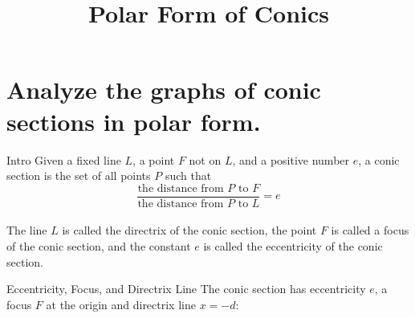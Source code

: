 \documentclass[t,usenames,dvipsnames]{beamer}
\title{Polar Form of Conics}
\author{}
\date{}
\begin{document}
\begin{frame}
    \titlepage
\end{frame}

\section{Analyze the graphs of conic sections in polar form.}

\begin{frame}{Intro}
Given a fixed line $L$, a point $F$ not on $L$, and a positive number $e$, a \alert{conic section} is the set of all points $P$ such that \vspace{10pt}
\[
\frac{\text{the distance from $P$ to $F$}}{\text{the distance from $P$ to $L$}} = e
\]
\pause
\newline\\

The line $L$ is called the \alert{directrix} of the conic section, the point $F$ is called a \alert{focus} of the conic section, and the constant $e$ is called the \alert{eccentricity} of the conic section.
\end{frame}


\begin{frame}{Eccentricity, Focus, and Directrix Line}
    The conic section has eccentricity $e$, a focus $F$ at the origin and directrix line $x = -d$: \newline\\

\begin{center}
\end{center}
\end{frame}
\end{document}
